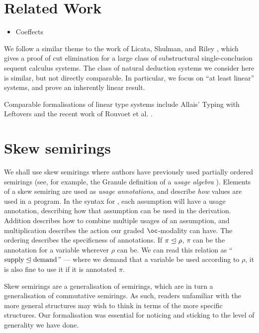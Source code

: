 \documentclass[submission,copyright,creativecommons]{eptcs}
\begin{document}
\section{Related Work}

\begin{itemize}
  \item Coeffects \cite{BrunelGMZ14,GhicaS14,reed10distance,PetricekOM14}
\end{itemize}

We follow a similar theme to the work of Licata, Shulman, and Riley
\cite{LicataSR17}, which gives a proof of cut elimination for a large class of
substructural single-conclusion sequent calculus systems.
The class of natural deduction systems we consider here is similar, but not
directly comparable.
In particular, we focus on ``at least linear'' systems, and prove an inherently
linear result.

Comparable formalisations of linear type systems include Allais' Typing with
Leftovers \cite{allais:LIPIcs:2018:10049} and the recent work of Rouvoet et al.
\cite{RPKV20}.

\section{Skew semirings}\label{sec:algebra}

We shall use skew semirings where authors have previously used partially ordered
semirings (see, for example, the Granule definition of a \emph{usage algebra} \cite{Granule18}).
Elements of a skew semiring are used as \emph{usage annotations}, and describe
\emph{how} values are used in a program.
In the syntax for \name{}, each assumption will have a usage annotation,
describing how that assumption can be used in the derivation.
Addition describes how to combine multiple usages of an assumption, and
multiplication describes the action our graded $\oc$-modality can have.
The ordering describes the specificness of annotations.
If $\pi \trianglelefteq \rho$, $\pi$ can be the annotation for a variable wherever
$\rho$ can be.
We can read this relation as ``$\textrm{supply} \trianglelefteq \textrm{demand}$'' ---
where we demand that a variable be used according to $\rho$, it is also fine to
use it if it is annotated $\pi$.

Skew semirings are a generalisation of semirings, which are in turn a
generalisation of commutative semirings.
As such, readers unfamiliar with the more general structures may wish to think
in terms of the more specific structures.
Our formalisation was essential for noticing and sticking to the level of
generality we have done.
\end{document}
